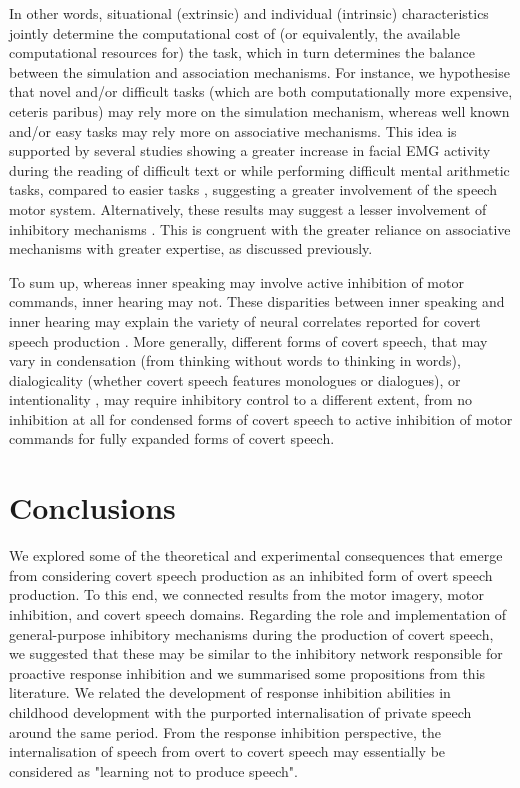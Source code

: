 \documentclass[utf8]{template/frontiersSCNS} %
\begin{document}
In other words, situational (extrinsic) and individual (intrinsic) characteristics jointly determine the computational cost of (or equivalently, the available computational resources for) the task, which in turn determines the balance between the simulation and association mechanisms. For instance, we hypothesise that novel and/or difficult tasks (which are both computationally more expensive, ceteris paribus) may rely more on the simulation mechanism, whereas well known and/or easy tasks may rely more on associative mechanisms. This idea is supported by several studies showing a greater increase in facial EMG activity during the reading of difficult text or while performing difficult mental arithmetic tasks, compared to easier tasks \citep[e.g.,][]{faaborg-andersen_electromyography_1958, sokolov_inner_1972}, suggesting a greater involvement of the speech motor system. Alternatively, these results may suggest a lesser involvement of inhibitory mechanisms \citep[see also the discussion in][]{nalborczyk_understanding_2019-1, nalborczyk_re-analysing_2020}. This is congruent with the greater reliance on associative mechanisms with greater expertise, as discussed previously.

To sum up, whereas inner speaking may involve active inhibition of motor commands, inner hearing may not. These disparities between inner speaking and inner hearing may explain the variety of neural correlates reported for covert speech production \citep[as reviewed for instance in][]{geva_inner_2018}. More generally, different forms of covert speech, that may vary in condensation (from thinking without words to thinking in words), dialogicality (whether covert speech features monologues or dialogues), or intentionality \citep[for more details, see][]{grandchamp_condialint_2019}, may require inhibitory control to a different extent, from no inhibition at all for condensed forms of covert speech to active inhibition of motor commands for fully expanded forms of covert speech.

\section{Conclusions}

We explored some of the theoretical and experimental consequences that emerge from considering covert speech production as an inhibited form of overt speech production. To this end, we connected results from the motor imagery, motor inhibition, and covert speech domains. Regarding the role and implementation of general-purpose inhibitory mechanisms during the production of covert speech, we suggested that these may be similar to the inhibitory network responsible for proactive response inhibition and we summarised some propositions from this literature. We related the development of response inhibition abilities in childhood development with the purported internalisation of private speech around the same period. From the response inhibition perspective, the internalisation of speech from overt to covert speech may essentially be considered as "learning not to produce speech".
\end{document}
